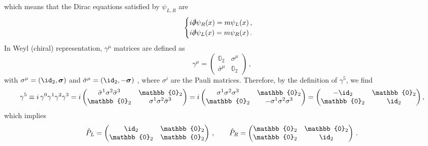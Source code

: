 \begin{sol}
    which means that the Dirac equations satisfied by $\psi_{L,R}$ are
    \begin{equation}
        \begin{cases}
            i\slashed{\partial} \psi_R(x) = m \psi_L(x) \, , \\
            i\slashed{\partial} \psi_L(x) = m \psi_R(x) \, .
        \end{cases}
    \end{equation}
    In Weyl (chiral) representation, $\gamma^\mu$ matrices are defined as
    \begin{equation}
        \gamma^\mu = 
        \begin{pmatrix}
            \mathbb{0}_2     & \sigma^\mu \\
            \bar{\sigma}^\mu & \mathbb{0}_2 
        \end{pmatrix} \, ,
    \end{equation}
    with $\sigma^\mu = (\id_2, \boldsymbol{\sigma})$ and $\bar{\sigma}^\mu = (\id_2, - \boldsymbol{\sigma})$ , where $\sigma^i$ are the Pauli matrices. Therefore, by the definition of $\gamma^5$, we find
    \begin{equation}
        \gamma^5 \define i \, \gamma^0 \gamma^1 \gamma^2 \gamma^3 = i
        \begin{pmatrix}
            \bar{\sigma}^1 \sigma^2 \bar{\sigma}^3 & \mathbb{0}_2 \\
            \mathbb{0}_2 & \sigma^1 \sigma^2 \bar{\sigma}^3 
        \end{pmatrix}
        = i 
        \begin{pmatrix}
            \sigma^1 \sigma^2 \sigma^3 & \mathbb{0}_2 \\
            \mathbb{0}_2 & - \sigma^1 \sigma^2 \sigma^3 
        \end{pmatrix} 
        = 
        \begin{pmatrix}
            - \id_2 & \mathbb{0}_2 \\
            \mathbb{0}_2 & \id_2   
        \end{pmatrix} ,
    \end{equation}
    which implies
    \begin{equation}
        \PL = 
        \begin{pmatrix}
            \id_2 & \mathbb{0}_2 \\
            \mathbb{0}_2 & \mathbb{0}_2 
        \end{pmatrix} \, ,
        \qquad
        \PR = 
        \begin{pmatrix}
            \mathbb{0}_2 & \mathbb{0}_2 \\
            \mathbb{0}_2 & \id_2 
        \end{pmatrix} \, .
    \end{equation}
\end{sol}
